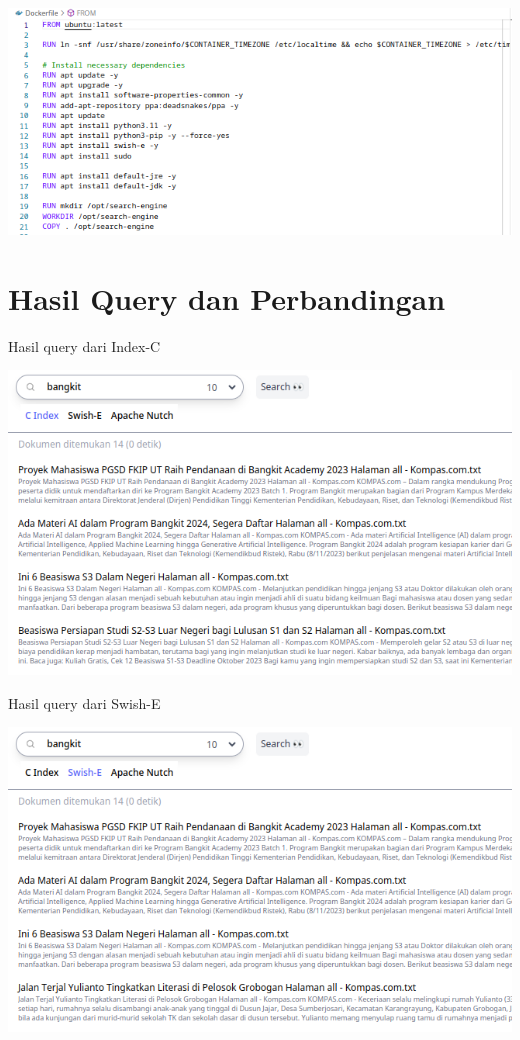 \documentclass[12pt]{article}
\begin{document}
    \includegraphics[scale=0.85]{images/docker.png}

    \newpage
    \section*{Hasil Query dan Perbandingan}

    Hasil query dari Index-C

    \includegraphics[scale=0.88]{images/query-c.png}

    Hasil query dari Swish-E

    \includegraphics[scale=0.88]{images/query-swish.png}
\end{document}
